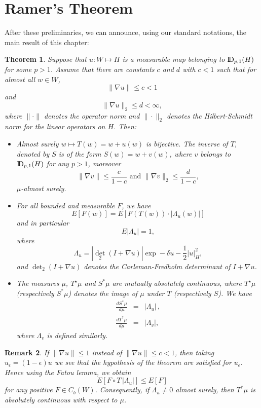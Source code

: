 \documentclass[12pt,a4paper]{book}
\newtheorem{theorem}{Theorem}[section]
\newtheorem{remarkk}[theorem]{Remark}
\newcommand{\DD}{{\rm I\!D}}
\newcommand{\dett}{{\textstyle{\det_2}}}
\begin{document}
\section{Ramer's Theorem}
After  these preliminaries, we can announce,  using our standard
notations,  the main result of this
chapter:
\begin{theorem}
\label{ramer-th}
Suppose that $u:W\mapsto H$ is a measurable map belonging to
$\DD_{p,1}(H)$ for some $p>1$. Assume that there are constants $c$ and
$d$ with {\bf$c<1$} such that for almost all $w\in W$, 
$$
\|\nabla u\|\leq c<1
$$
and
$$
\|\nabla u\|_2\leq d<\infty,
$$
where $\| \cdot \| $ denotes the operator norm and
$\| \cdot \|_2 $ denotes the Hilbert-Schmidt norm for the linear
operators on $H$. 
Then:
\begin{itemize}
\item
Almost surely $w\mapsto T(w) = w + u(w)$ is bijective. The inverse of
$T$, denoted by $S$ is of the form $S(w)=w+v(w)$, where $v$ belongs to
$\DD_{p,1}(H)$ for any $p>1$, moreover 
$$
\|\nabla v\|\leq \frac{c}{1-c}\,\,{\mbox{and}}\,\, \|\nabla
v\|_2\leq\frac{d}{1-c}, 
$$
$\mu$-almost surely.

\item For all bounded and measurable $F$, we have
$$
E[F(w)] = E[F(T(w)) \cdot | \Lambda_u(w) |]
$$
 and in particular
$$
E|\Lambda_u| =1,
$$
where
$$
\Lambda_u=|\dett(I+\nabla u)|\exp-\delta u-\frac{1}{2}|u|_H^2,
$$
and $\det_2(I+\nabla u)$ denotes the Carleman-Fredholm determinant of
$I+\nabla u$.
\item
The measures
$\mu$,  $ T^{\star}\mu$ and $S^*\mu$ are mutually absolutely continuous, where
$T^{\star}\mu$ (respectively $S^*\mu$) denotes the image of $\mu$
under $T$ (respectively $S$). We have 
\begin{eqnarray*}
\frac{dS^*\mu}{d\mu}&=&|\Lambda_u|\,,\\
\frac{dT^*\mu}{d\mu}&=&|\Lambda_v|,
\end{eqnarray*}
where $\Lambda_v$ is defined similarly.
\end{itemize}
\end{theorem}
\begin{remarkk}{\rm
If $\|\nabla u\|\leq 1$ instead of
$\|\nabla u\|\leq c< 1$, then taking $u_\epsilon=(1-\epsilon)u$ we see that
 the hypothesis of the theorem are satisfied for $u_\epsilon$. Hence using the
   Fatou lemma, we obtain
$$
E[F\circ T \,|\Lambda_u|]\leq E[F]
$$
for any positive $F\in C_b(W)$. Consequently, if $\Lambda_u\neq 0$
almost surely, then $T^*\mu$ is absolutely continuous with respect to
$\mu$.} 
\end{remarkk}
\end{document}
